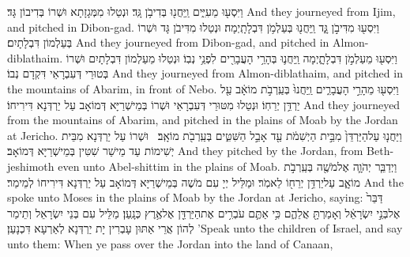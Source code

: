 {וַיִּסְע֖וּ מֵעִיִּ֑ים וַֽיַּחֲנ֖וּ בְּדִיבֹ֥ן גָּֽד׃}
{וּנְטַלוּ מִמְּגָזָתָא וּשְׁרוֹ בְּדִיבוֹן גָּד׃}
{And they journeyed from Ijim, and pitched in Dibon-gad.}{}
{וַיִּסְע֖וּ מִדִּיבֹ֣ן גָּ֑ד וַֽיַּחֲנ֖וּ בְּעַלְמֹ֥ן דִּבְלָתָֽיְמָה׃}
{וּנְטַלוּ מִדִּיבֹן גָּד וּשְׁרוֹ בְּעַלְמוֹן דִּבְלָתָיִם׃}
{And they journeyed from Dibon-gad, and pitched in Almon-diblathaim.}{}
{וַיִּסְע֖וּ מֵעַלְמֹ֣ן דִּבְלָתָ֑יְמָה וַֽיַּחֲנ֛וּ בְּהָרֵ֥י הָעֲבָרִ֖ים לִפְנֵ֥י נְבֽוֹ׃}
{וּנְטַלוּ מֵעַלְמוֹן דִּבְלָתָיִם וּשְׁרוֹ בְּטוּרֵי דְּעִבְרָאֵי דִּקְדָם נְבוֹ׃}
{And they journeyed from Almon-diblathaim, and pitched in the mountains of Abarim, in front of Nebo.}{}
{וַיִּסְע֖וּ מֵהָרֵ֣י הָעֲבָרִ֑ים וַֽיַּחֲנוּ֙ בְּעַֽרְבֹ֣ת מוֹאָ֔ב עַ֖ל יַרְדֵּ֥ן יְרֵחֽוֹ׃}
{וּנְטַלוּ מִטּוּרֵי דְּעִבְרָאֵי וּשְׁרוֹ בְּמֵישְׁרַיָּא דְּמוֹאָב עַל יַרְדְּנָא דִּירִיחוֹ׃}
{And they journeyed from the mountains of Abarim, and pitched in the plains of Moab by the Jordan at Jericho.}{}
{וַיַּחֲנ֤וּ עַל\maqqaf הַיַּרְדֵּן֙ מִבֵּ֣ית הַיְשִׁמֹ֔ת עַ֖ד אָבֵ֣ל הַשִּׁטִּ֑ים בְּעַֽרְבֹ֖ת מוֹאָֽב׃ \setuma }
{וּשְׁרוֹ עַל יַרְדְּנָא מִבֵּית יְשִׁימוֹת עַד מֵישַׁר שִׁטִּין בְּמֵישְׁרַיָּא דְּמוֹאָב׃}
{And they pitched by the Jordan, from Beth-jeshimoth even unto Abel-shittim in the plains of Moab.}{}
{וַיְדַבֵּ֧ר יְהֹוָ֛ה אֶל\maqqaf מֹשֶׁ֖ה בְּעַֽרְבֹ֣ת מוֹאָ֑ב עַל\maqqaf יַרְדֵּ֥ן יְרֵח֖וֹ לֵאמֹֽר׃}
{וּמַלֵּיל יְיָ עִם מֹשֶׁה בְּמֵישְׁרַיָּא דְּמוֹאָב עַל יַרְדְּנָא דִּירִיחוֹ לְמֵימַר׃}
{And the \lord\space spoke unto Moses in the plains of Moab by the Jordan at Jericho, saying:}{}
{דַּבֵּר֙ אֶל\maqqaf בְּנֵ֣י יִשְׂרָאֵ֔ל וְאָמַרְתָּ֖ אֲלֵהֶ֑ם כִּ֥י אַתֶּ֛ם עֹבְרִ֥ים אֶת\maqqaf הַיַּרְדֵּ֖ן אֶל\maqqaf אֶ֥רֶץ כְּנָֽעַן׃}
{מַלֵּיל עִם בְּנֵי יִשְׂרָאֵל וְתֵימַר לְהוֹן אֲרֵי אַתּוּן עָבְרִין יָת יַרְדְּנָא לְאַרְעָא דִּכְנָעַן׃}
{’Speak unto the children of Israel, and say unto them: When ye pass over the Jordan into the land of Canaan,}{}
